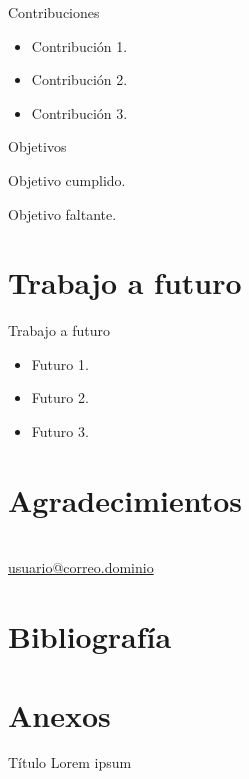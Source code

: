 \documentclass[9pt]{beamer}
\newcommand{\cmark}{\ding{51}}%
\newcommand{\done}{\rlap{$\square$}{\raisebox{2pt}{\large\hspace{1pt}\cmark}}%
\hspace{-2.5pt}}
\begin{document}
\begin{frame}{Contribuciones}
	\begin{itemize}
		\item Contribución 1.
		\item Contribución 2.
		\item Contribución 3.
	\end{itemize}
\end{frame}

\begin{frame}{Objetivos}
	\begin{todolist}
		\item[\done] Objetivo cumplido.
		\item Objetivo faltante.
	\end{todolist}
\end{frame}

\section{Trabajo a futuro}
\begin{frame}{Trabajo a futuro}
	\begin{itemize}
		\item Futuro 1.
		\item Futuro 2.
		\item Futuro 3.
	\end{itemize}
\end{frame}

\section*{Agradecimientos}
\begin{frame}
	 \\
	
	\url{usuario@correo.dominio}
	
\end{frame}


\section*{Bibliografía}
\begin{frame}[allowframebreaks]
	
	
\end{frame}

\section{Anexos}
\begin{frame}{Título}
	Lorem ipsum
\end{frame}
\end{document}
